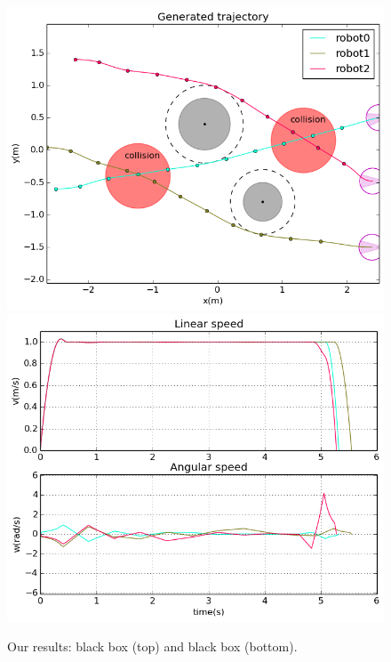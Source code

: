 \documentclass[eprint]{actapoly}
\begin{document}
\begin{figure}[!h]\centering
  \includegraphics[width=\linewidth]{./images/collision/multirobot-path.png} %
  \\[1mm]
  \includegraphics[width=\linewidth]{./images/collision/multirobot-vw.png} %
  \caption{Our results: black box (top) and black box (bottom).\label{fig:collision}}
\label{fig:res}
\end{figure}
\end{document}
